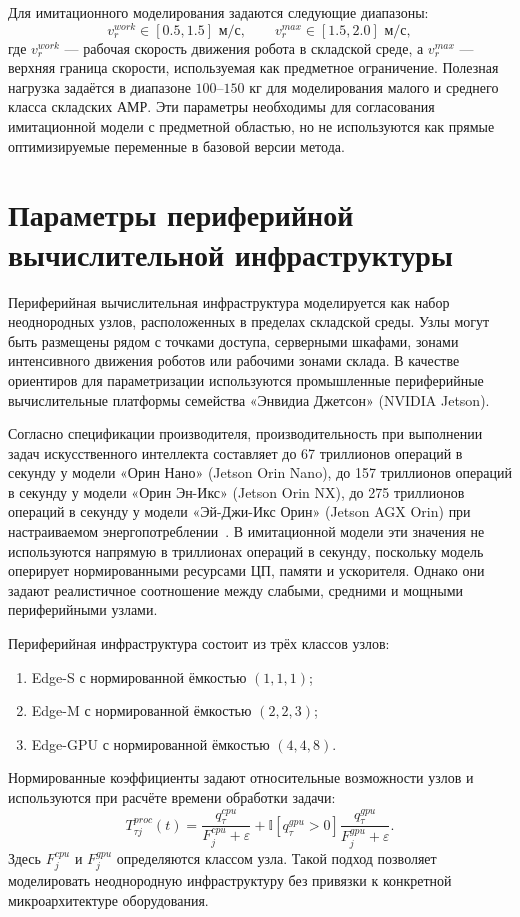 Для имитационного моделирования задаются следующие диапазоны:
\[
v^{work}_{r} \in [0.5, 1.5] \text{ м/с},
\qquad
v^{max}_{r} \in [1.5, 2.0] \text{ м/с},
\]
где $v^{work}_{r}$ --- рабочая скорость движения робота в складской среде, а $v^{max}_{r}$ --- верхняя граница скорости, используемая как предметное ограничение. Полезная нагрузка задаётся в диапазоне $100$--$150$ кг для моделирования малого и среднего класса складских АМР. Эти параметры необходимы для согласования имитационной модели с предметной областью, но не используются как прямые оптимизируемые переменные в базовой версии метода.

\section{Параметры периферийной вычислительной инфраструктуры}

Периферийная вычислительная инфраструктура моделируется как набор неоднородных узлов, расположенных в пределах складской среды. Узлы могут быть размещены рядом с точками доступа, серверными шкафами, зонами интенсивного движения роботов или рабочими зонами склада. В качестве ориентиров для параметризации используются промышленные периферийные вычислительные платформы семейства «Энвидиа Джетсон» (NVIDIA Jetson).

Согласно спецификации производителя, производительность при выполнении задач искусственного интеллекта составляет до 67 триллионов операций в секунду у модели «Орин Нано» (Jetson Orin Nano), до 157 триллионов операций в секунду у модели «Орин Эн-Икс» (Jetson Orin NX), до 275 триллионов операций в секунду у модели «Эй-Джи-Икс Орин» (Jetson AGX Orin) при настраиваемом энергопотреблении~\cite{NvidiaJetsonOrinSeries2026}. В имитационной модели эти значения не используются напрямую в триллионах операций в секунду, поскольку модель оперирует нормированными ресурсами ЦП, памяти и ускорителя. Однако они задают реалистичное соотношение между слабыми, средними и мощными периферийными узлами.

Периферийная инфраструктура состоит из трёх классов узлов:
\begin{enumerate}
	\item Edge-S с нормированной ёмкостью $(1,1,1)$;
	\item Edge-M с нормированной ёмкостью $(2,2,3)$;
	\item Edge-GPU с нормированной ёмкостью $(4,4,8)$.
\end{enumerate}

Нормированные коэффициенты задают относительные возможности узлов и используются при расчёте времени обработки задачи:
\[
T^{proc}_{\tau j}(t)
=
\frac{q^{cpu}_{\tau}}{F^{cpu}_{j}+\varepsilon}
+
\mathbb{I}[q^{gpu}_{\tau}>0]
\frac{q^{gpu}_{\tau}}{F^{gpu}_{j}+\varepsilon}.
\]
Здесь $F^{cpu}_{j}$ и $F^{gpu}_{j}$ определяются классом узла. Такой подход позволяет моделировать неоднородную инфраструктуру без привязки к конкретной микроархитектуре оборудования.

